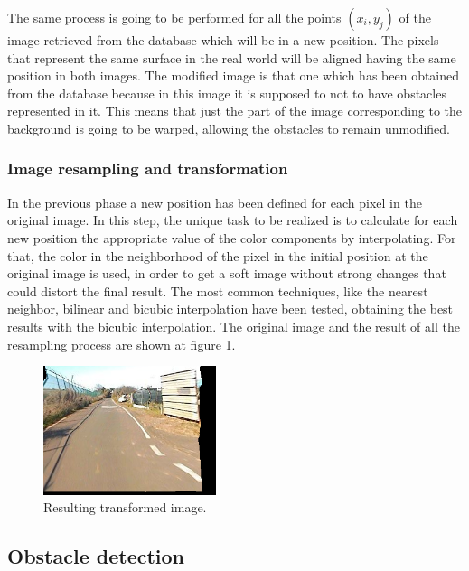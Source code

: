 The same process is going to be performed for all the points $(x_i, y_j)$ of the image retrieved from the database which will be in a new position. The pixels that represent the same surface in the real world will be aligned having the same position in both images. The modified image is that one which has been obtained from the database because in this image it is supposed to not to have obstacles represented in it. This means that just the part of the image corresponding to the background is going to be warped, allowing the obstacles to remain unmodified.

\subsubsection{Image resampling and transformation}\label{ch:chapter02_01_02_04}

In the previous phase a new position has been defined for each pixel in the original image. In this step, the unique task to be realized is to calculate for each new position the appropriate value of the color components by interpolating. For that, the color in the neighborhood of the pixel in the initial position at the original image is used, in order to get a soft image without strong changes that could distort the final result. The most common techniques, like the nearest neighbor, bilinear and bicubic interpolation have been tested, obtaining the best results with the bicubic interpolation. The original image and the result of all the resampling process are shown at figure \ref{fig:cp02_transform_and_resample}.

\begin{figure}[h!]
\centering
\includegraphics[width=0.45\textwidth]{transformed}
\caption{Resulting transformed image.}\label{fig:cp02_transform_and_resample}
\end{figure}

\subsection{Obstacle detection}\label{ch:chapter02_01_03}

